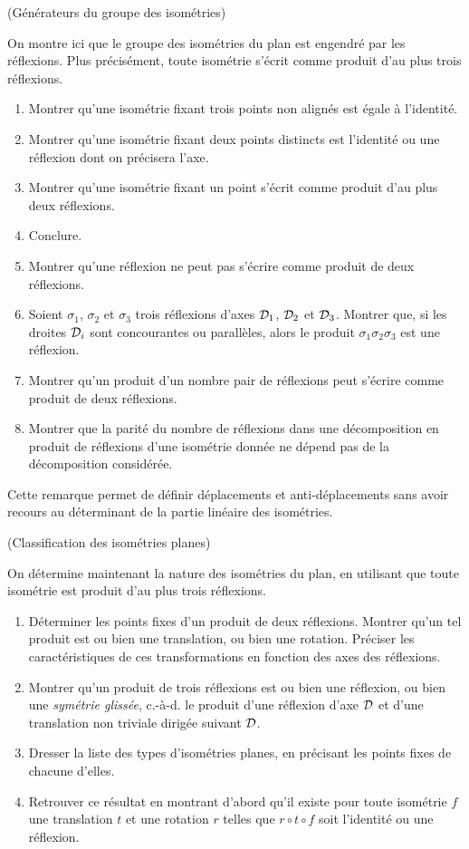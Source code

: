 \documentclass[a4paper,11pt,reqno]{amsart}
\begin{document}
\begin{exo} (Générateurs du groupe des isométries)

  On montre ici que le groupe des isométries du plan est engendré par les réflexions. Plus précisément, toute isométrie s'écrit comme produit d'au plus trois réflexions.
  \begin{enumerate}
    \item Montrer qu'une isométrie fixant trois points non alignés est égale à l'identité.
    \item Montrer qu'une isométrie fixant deux points distincts est l'identité ou une réflexion dont on précisera l'axe.
    \item Montrer qu'une isométrie fixant un point s'écrit comme produit d'au plus deux réflexions.
    \item Conclure.
    \item Montrer qu'une réflexion ne peut pas s'écrire comme produit de deux réflexions.
    \item Soient $\sigma_1$, $\sigma_2$ et $\sigma_3$ trois réflexions d'axes $\mathcal{D}_1$, $\mathcal{D}_2$ et $\mathcal{D}_3$. Montrer que, si les droites $\mathcal{D}_i$ sont concourantes ou parallèles, alors le produit $\sigma_1 \sigma_2 \sigma_3$ est une réflexion.
    \item Montrer qu'un produit d'un nombre pair de réflexions peut s'écrire comme produit de deux réflexions.
    \item Montrer que la parité du nombre de réflexions dans une décomposition en produit de réflexions d'une isométrie donnée ne dépend pas de la décomposition considérée.
  \end{enumerate}
  Cette remarque permet de définir déplacements et anti-déplacements sans avoir recours au déterminant de la partie linéaire des isométries.
\end{exo}

\begin{exo} (Classification des isométries planes)

  On détermine maintenant la nature des isométries du plan, en utilisant que toute isométrie est produit d'au plus trois réflexions.
  \begin{enumerate}
    \item Déterminer les points fixes d'un produit de deux réflexions. Montrer qu'un tel produit est ou bien une translation, ou bien une rotation. Préciser les caractéristiques de ces transformations en fonction des axes des réflexions.
    \item Montrer qu'un produit de trois réflexions est ou bien une réflexion, ou bien une \emph{symétrie glissée}, c.-à-d. le produit d'une réflexion d'axe $\mathcal{D}$ et d'une translation non triviale dirigée suivant $\mathcal{D}$.
    \item Dresser la liste des types d'isométries planes, en précisant les points fixes de chacune d'elles.
    \item Retrouver ce résultat en montrant d'abord qu'il  existe pour toute isométrie $f$ une translation $t$ et une rotation $r$ telles que $r \circ t \circ f$ soit l'identité ou une réflexion.
  \end{enumerate}
\end{exo}
\end{document}
